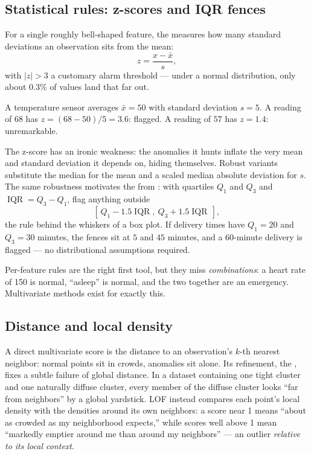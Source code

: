 \subsection{Statistical rules: z-scores and IQR fences}

For a single roughly bell-shaped feature, the  measures how many standard deviations an observation sits from the mean:
\[
  z=\frac{x-\bar{x}}{s},
\]
with $|z|>3$ a customary alarm threshold --- under a normal distribution, only about $0.3\%$ of values land that far out.

\begin{workedexample}
A temperature sensor averages $\bar{x}=50$ with standard deviation $s=5$. A reading of $68$ has $z=(68-50)/5=3.6$: flagged. A reading of $57$ has $z=1.4$: unremarkable.
\end{workedexample}

The z-score has an ironic weakness: the anomalies it hunts inflate the very mean and standard deviation it depends on, hiding themselves. Robust variants substitute the median for the mean and a scaled median absolute deviation for $s$. The same robustness motivates the  from : with quartiles $Q_1$ and $Q_3$ and $\operatorname{IQR}=Q_3-Q_1$, flag anything outside
\[
  [\,Q_1-1.5\operatorname{IQR},\ Q_3+1.5\operatorname{IQR}\,],
\]
the rule behind the whiskers of a box plot. If delivery times have $Q_1=20$ and $Q_3=30$ minutes, the fences sit at $5$ and $45$ minutes, and a 60-minute delivery is flagged --- no distributional assumptions required.

Per-feature rules are the right first tool, but they miss \emph{combinations}: a heart rate of 150 is normal, ``asleep'' is normal, and the two together are an emergency. Multivariate methods exist for exactly this.

\subsection{Distance and local density}

A direct multivariate score is the distance to an observation's $k$-th nearest neighbor: normal points sit in crowds, anomalies sit alone. Its refinement, the , fixes a subtle failure of global distance. In a dataset containing one tight cluster and one naturally diffuse cluster, every member of the diffuse cluster looks ``far from neighbors'' by a global yardstick. LOF instead compares each point's local density with the densities around its own neighbors: a score near 1 means ``about as crowded as my neighborhood expects,'' while scores well above 1 mean ``markedly emptier around me than around my neighbors'' --- an outlier \emph{relative to its local context}.

